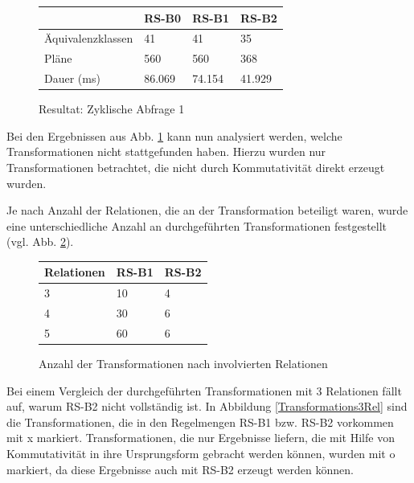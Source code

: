 \begin{figure}[ht]
  \centering
  \begin{tabular}{|l|l|l|l|}
\hline
                  & RS-B0  & RS-B1  & RS-B2  \\ \hline
Äquivalenzklassen & 41     & 41     & 35     \\ \hline
Pläne             & 560    & 560    & 368    \\ \hline
Dauer (ms)        & 86.069 & 74.154 & 41.929 \\ \hline
\end{tabular}
  \caption{Resultat: Zyklische Abfrage 1}
  \label{ResCylceJoin1}

\end{figure}


Bei den Ergebnissen aus Abb. \ref{ResCylceJoin1} kann nun analysiert werden, welche Transformationen nicht stattgefunden haben. Hierzu wurden nur Transformationen betrachtet, die nicht durch Kommutativität direkt erzeugt wurden.

Je nach Anzahl der Relationen, die an der Transformation beteiligt waren, wurde eine unterschiedliche Anzahl an durchgeführten Transformationen festgestellt (vgl. Abb. \ref{involvedRelations}).


\begin{figure}[ht]
\centering

\begin{tabular}{|l|l|l|}
\hline
{\bf Relationen} & {\bf RS-B1} & {\bf RS-B2} \\ \hline
3                & 10          & 4           \\ \hline
4                & 30          & 6           \\ \hline
5                & 60          & 6           \\ \hline
\end{tabular}

\caption{Anzahl der Transformationen nach involvierten Relationen}
\label{involvedRelations}
\end{figure}


Bei einem Vergleich der durchgeführten Transformationen mit 3 Relationen fällt auf, warum RS-B2 nicht vollständig ist. In Abbildung \ref{Transformations3Rel} sind die Transformationen, die in den Regelmengen RS-B1 bzw. RS-B2 vorkommen mit x markiert. Transformationen, die nur Ergebnisse liefern, die mit Hilfe von Kommutativität in ihre Ursprungsform gebracht werden können, wurden mit o markiert, da diese Ergebnisse auch mit RS-B2 erzeugt werden können.


